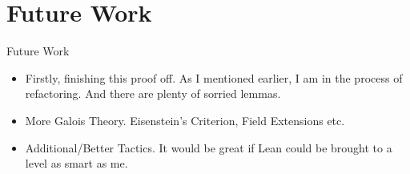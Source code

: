 \documentclass{beamer}
\begin{document}
\section{Future Work}

\begin{frame}{Future Work}  
  \begin{itemize}
    \item Firstly, finishing this proof off. As I mentioned earlier, I am in the process of refactoring. And there are plenty of sorried lemmas. 
    \item More Galois Theory. Eisenstein's Criterion, Field Extensions etc. 
    \item Additional/Better Tactics. It would be great if Lean could be brought to a level as smart as me. 
  \end{itemize}
  
\end{frame}
\end{document}
